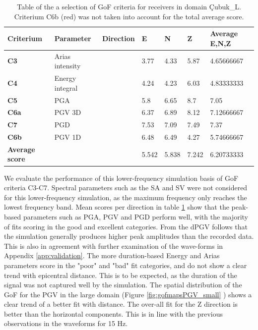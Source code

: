 \documentclass[../Text/00main.tex]{subfiles}
\begin{document}
\begin{table}[h!]
\caption{Table of the a selection of \cite{anderson_quantitative_nodate} GoF criteria for receivers in domain Çubuk\_L. Criterium C6b (red) was not taken into account for the total average score. }
\begin{tabular}{@{}l|llllll@{}}

\toprule
\textbf{Criterium} & \textbf{Parameter} & \textbf{Direction} & \textbf{E} & \textbf{N} & \textbf{Z} & \textbf{Average E,N,Z} \\ \midrule
\textbf{C3}            & Arias intensity &  & 3.77  & 4.33  & 5.87  & 4.65666667 \\
\textbf{C4}            & Energy integral &  & 4.24  & 4.23  & 6.03  & 4.83333333 \\
\textbf{C5}            & PGA             &  & 5.8   & 6.65  & 8.7   & 7.05       \\
\textbf{C6a}           & PGV 3D          &  & 6.37  & 6.89  & 8.12  & 7.12666667 \\
\textbf{C7}            & PGD             &  & 7.53  & 7.09  & 7.49  & 7.37       \\
\rowcolor[HTML]{FFCCC9} 
\textbf{C6b}           & PGV 1D          &  & 6.48  & 6.49  & 4.27  & 5.74666667 \\ \midrule
\textbf{Average score} &                 &  & 5.542 & 5.838 & 7.242 & 6.20733333 \\ \bottomrule
\end{tabular}
\label{tab:GoF_table_large_domain}
\end{table}

We evaluate the performance of this lower-frequency simulation basis of GoF criteria C3-C7. Spectral parameters such as the SA and SV were not considered for this lower-frequency simulation, as the maximum frequency only reaches the lowest frequency band. Mean scores per direction in table \ref{tab:GoF_table_large_domain} show that the peak-based parameters such as PGA, PGV and PGD perform well, with the majority of fits scoring in the good and excellent categories. From the dPGV follows that the simulation generally produces higher peak amplitudes than the recorded data. This is also in agreement with further examination of the wave-forms in Appendix \ref{app:validation}. The more duration-based Energy and Arias parameters score in the "poor" and "bad" fit categories, and do not show a clear trend with epicentral distance. This is to be expected, as the duration of the signal was not captured well by the simulation. The spatial distribution of the GoF for the PGV in the large domain (Figure \ref{fig:gofmapsPGV_small} ) shows a clear trend of a better fit with distance. The over-all fit for the Z direction is better than the horizontal components. This is in line with the previous observations in the waveforms for 15 Hz.  
\end{document}
